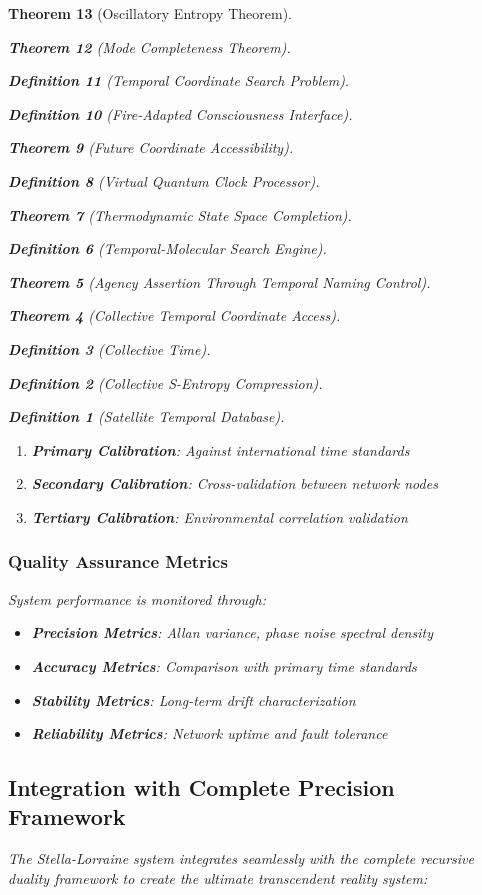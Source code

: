 \documentclass[12pt,a4paper]{article}
\newtheorem{theorem}{Theorem}[section]
\newtheorem{definition}[theorem]{Definition}
\begin{document}
\begin{theorem}[Oscillatory Entropy Theorem]
\begin{theorem}[Mode Completeness Theorem]
\begin{enumerate}
\begin{definition}[Temporal Coordinate Search Problem]
\begin{algorithm}
\begin{definition}[Fire-Adapted Consciousness Interface]
\begin{theorem}[Future Coordinate Accessibility]
\begin{definition}[Virtual Quantum Clock Processor]
\begin{itemize}
\begin{itemize}
\begin{theorem}[Thermodynamic State Space Completion]
\begin{definition}[Temporal-Molecular Search Engine]
\begin{theorem}[Agency Assertion Through Temporal Naming Control]
\begin{remark}
\begin{theorem}[Collective Temporal Coordinate Access]
\begin{definition}[Collective Time]
\begin{definition}[Collective S-Entropy Compression]
\begin{definition}[Satellite Temporal Database]
\begin{algorithm}
\begin{table}[h]
{{\begin{enumerate}
\item \textbf{Primary Calibration}: Against international time standards
\item \textbf{Secondary Calibration}: Cross-validation between network nodes
\item \textbf{Tertiary Calibration}: Environmental correlation validation
\end{enumerate}

\subsubsection{Quality Assurance Metrics}

System performance is monitored through:

\begin{itemize}
\item \textbf{Precision Metrics}: Allan variance, phase noise spectral density
\item \textbf{Accuracy Metrics}: Comparison with primary time standards
\item \textbf{Stability Metrics}: Long-term drift characterization
\item \textbf{Reliability Metrics}: Network uptime and fault tolerance
\end{itemize}

\subsection{Integration with Complete Precision Framework}

The Stella-Lorraine system integrates seamlessly with the complete recursive duality framework to create the ultimate transcendent reality system:

}}
\end{table}
\end{algorithm}
\end{definition}
\end{definition}
\end{definition}
\end{theorem}
\end{remark}
\end{theorem}
\end{definition}
\end{theorem}
\end{itemize}
\end{itemize}
\end{definition}
\end{theorem}
\end{definition}
\end{algorithm}
\end{definition}
\end{enumerate}
\end{theorem}
\end{theorem}
\end{document}
